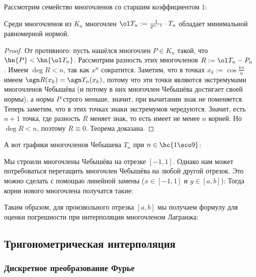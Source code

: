 \documentclass[a4paper]{article}
\begin{document}
Рассмотрим семейство многочленов со старшим коэффициентом $1$:

\begin{theorem}
Среди многочленов из $K_n$ многочлен $\ol T_n := \frac{1}{2^{n-1}}\cdot T_n$ обладает минимальной равномерной нормой.
\end{theorem}
\begin{proof}
От противного: пусть нашёлся многочлен $P \in K_n$ такой, что $\hn{P} < \hn{\ol T_n}$. Рассмотрим разность этих многочленов
$R := \ol T_n - P_n$. Имеем $\deg R < n$, так как $x^n$ сократится. Заметим, что в точках $x_k := \cos \frac{k\pi}{n}$
имеем $\sgn R(x_k) = \sgn T_n(x_k)$, потому что эти точки являются экстремумами многочленов Чебышёва (и потому в
них многочлен Чебышёва достигает своей нормы), а норма $P$ строго меньше, значит, при вычитании знак не поменяется.
Теперь заметим, что в этих точках знаки экстремумов чередуются. Значит, есть $n+1$ точка, где разность $R$ меняет знак,
то есть имеет не менее $n$ корней. Но $\deg R < n$, поэтому $R\equiv0$. Теорема доказана.
\end{proof}

А вот графики многочленов Чебышева $T_n$ при $n\in \hc{1\sco9}$:

\centerline{\;\;\;\;\;
\;\;}


Мы строили многочлены Чебышёва на отрезке $[-1,1]$. Однако нам может потребоваться
перетащить многочлен Чебышёва на любой другой отрезок. Это можно сделать с помощью линейной
замены ($x \in [-1,1]$ и $y \in [a,b]$):
Тогда корни нового многочлена получатся такие:

Таким образом, для произвольного отрезка $[a,b]$ мы получаем формулу для оценки погрешности
при интерполяции многочленом Лагранжа:

\subsection{Тригонометрическая интерполяция}

\subsubsection{Дискретное преобразование Фурье}
\end{document}
